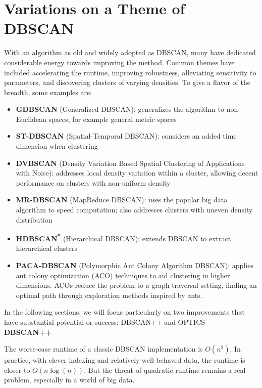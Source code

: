 \section{Variations on a Theme of DBSCAN}

With an algorithm as old and widely adopted as DBSCAN, many have dedicated considerable energy towards improving the method. Common themes have included accelerating the runtime, improving robustness, alleviating sensitivity to parameters, and discovering clusters of varying densities. To give a flavor of the breadth, some examples are:\cite{dbscan_improvs}

\begin{itemize}
    \item \textbf{GDBSCAN} (Generalized DBSCAN): generalizes the algorithm to non-Euclidean spaces, for example general metric spaces
    \item \textbf{ST-DBSCAN} (Spatial-Temporal DBSCAN): considers an added time dimension when clustering
    \item \textbf{DVBSCAN} (Density Variation Based Spatial Clustering of Applications with Noise): addresses local density variation within a cluster, allowing decent performance on clusters with non-uniform density
    \item \textbf{MR-DBSCAN} (MapReduce DBSCAN): uses the popular big data algorithm to speed computation; also addresses clusters with uneven density distribution
    \item \textbf{HDBSCAN\textsuperscript{*}} (Hierarchical DBSCAN): extends DBSCAN to extract hierarchical clusters
    \item \textbf{PACA-DBSCAN} (Polymorphic Ant Colony Algorithm DBSCAN): applies ant colony optimization (ACO) techniques to aid clustering in higher dimensions. ACOs reduce the problem to a graph traversal setting, finding an optimal path through exploration methods inspired by ants.
\end{itemize}

In the following sections, we will focus particularly on two improvements that have substantial potential or success: DBSCAN++ and OPTICS \\

\noindent\textbf{DBSCAN++}

The worse-case runtime of a classic DBSCAN implementation is $O(n^2)$. In practice, with clever indexing and relatively well-behaved data, the runtime is closer to $O(n \log(n))$. But the threat of quadratic runtime remains a real problem, especially in a world of big data.

